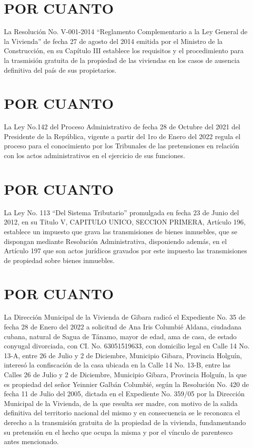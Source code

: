 \documentclass[11pt,letterpaper]{article}
\begin{document}
    \section{POR CUANTO}
        La Resolución No. V-001-2014 “Reglamento Complementario a la Ley General de la Vivienda” de fecha 27 de agosto del 2014 emitida por el Ministro de la Construcción, en su Capítulo III establece los requisitos y el procedimiento para la trasmisión gratuita de la propiedad de las viviendas en los casos de ausencia definitiva del país de sus propietarios.
    \section{POR CUANTO}
        La Ley No.142 del Proceso Administrativo de fecha 28 de Octubre del 2021 del Presidente de la República, vigente a partir del 1ro de Enero del 2022 regula el proceso para el conocimiento por los Tribunales de las pretensiones en relación con los actos administrativos en el ejercicio de sus funciones.
    \section{POR CUANTO}
        La Ley No. 113  “Del Sistema Tributario” promulgada en fecha 23 de Junio del 2012, en su Título V, CAPITULO UNICO, SECCION PRIMERA, Artículo 196, establece un impuesto que grava las transmisiones de bienes inmuebles, que se dispongan mediante Resolución Administrativa, disponiendo además, en el Artículo 197 que son actos jurídicos gravados por este impuesto las transmisiones de propiedad sobre bienes inmuebles.
    \section{POR CUANTO}
        La Dirección Municipal de la Vivienda de Gibara radicó el Expediente No. 35 de fecha 28 de Enero del 2022 a solicitud de Ana Iris Columbié Aldana, ciudadana cubana, natural de Sagua de Tánamo, mayor de edad, ama de casa, de estado conyugal divorciada, con CI. No. 63051519633, con domicilio legal en Calle 14 No. 13-A, entre 26 de Julio y 2 de Diciembre, Municipio Gibara, Provincia Holguín, interesó  la confiscación de la casa ubicada en la Calle 14 No. 13-B, entre las Calles 26 de Julio y 2 de Diciembre, Municipio Gibara, Provincia Holguín, la que es propiedad del señor  Yeinnier Galbán Columbié,  según la Resolución No. 420 de fecha 11 de Julio del 2005, dictada en el Expediente No. 359/05 por la Dirección Municipal de la Vivienda, de la que resulta ser madre, con motivo de la salida  definitiva  del  territorio  nacional  del  mismo  y  en  consecuencia  se  le reconozca el derecho a la transmisión gratuita de la propiedad de la vivienda, fundamentando su pretensión en el hecho que ocupa la misma y por el vínculo de parentesco antes mencionado.    
\end{document}
